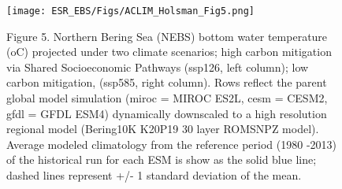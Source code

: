 \documentclass[
]{article}
\begin{document}
\begin{figure}
\centering
\texttt{[image: ESR\_EBS/Figs/ACLIM\_Holsman\_Fig5.png]}
\caption{Figure 5. Northern Bering Sea (NEBS) bottom water temperature
(oC) projected under two climate scenarios; high carbon mitigation via
Shared Socioeconomic Pathways (ssp126, left column); low carbon
mitigation, (ssp585, right column). Rows reflect the parent global model
simulation (miroc = MIROC ES2L, cesm = CESM2, gfdl = GFDL ESM4)
dynamically downscaled to a high resolution regional model (Bering10K
K20P19 30 layer ROMSNPZ model). Average modeled climatology from the
reference period (1980 -2013) of the historical run for each ESM is show
as the solid blue line; dashed lines represent +/- 1 standard deviation
of the mean.}
\end{figure}
\end{document}
